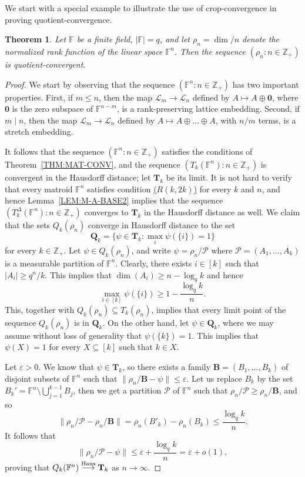 \documentclass[10pt]{article}
\theoremstyle{plain}
\newtheorem{thm}{Theorem}[section]
\theoremstyle{definition}
\newcommand{\bB}{\mathbf{B}}
\newcommand{\bT}{\mathbf{T}}
\newcommand{\bQ}{\mathbf{Q}}
\newcommand{\bbZ}{\mathbb{Z}}
\newcommand{\bbF}{\mathbb{F}}
\newcommand{\LL}{\mathcal{L}}
\newcommand{\cP}{\mathcal{P}}
\newcommand{\eps}{\varepsilon}
\newcommand{\Haus}{{\text{\rm Haus}}}
\newcommand{\hto}{\stackrel{\Haus}{\longrightarrow}}
\begin{document}
We start with a special example to illustrate the use of crop-convergence in
proving quotient-convergence.

\begin{thm}\label{THM:FIN-GEOM}
Let $ \bbF$ be a finite field, $|\bbF|=q$, and let $\rho_n=\dim/n$ denote the
normalized rank function of the linear space $\bbF^n$. Then the sequence
$(\rho_n\colon n\in\bbZ_+)$ is quotient-convergent.
\end{thm}
\begin{proof}
We start by observing that the sequence $(\bbF^n\colon n\in\bbZ_+)$ has two important properties. First, if $m\le n$, then the map $\LL_m\to\LL_n$ defined by $A\mapsto A\oplus \mathbf{0}$, where $\mathbf{0}$ is the zero subspace of $\bbF^{n-m}$, is a rank-preserving lattice embedding. Second, if $m\mid n$, then the map $\LL_m\to\LL_n$ defined by $A\mapsto A\oplus\dots\oplus A$, with $n/m$ terms, is a stretch embedding. 

It follows that the sequence $(\bbF^n\colon n\in\bbZ_+)$ satisfies the conditions of Theorem~\ref{THM:MAT-CONV}, and the sequence $(T_k(\bbF^n)\colon n\in\bbZ_+)$ is
convergent in the Hausdorff distance; let $ \bT_k$ be its limit. It is not hard to verify that every matroid $\bbF^n$ satisfies condition
\hyperlink{rkm}{($R(k,2k)$)} for every $k$ and $n$, and hence Lemma~\ref{LEM:M-A-BASE2} implies
that the sequence $(T^\Delta_k(\bbF^n)\colon n\in\bbZ_+)$ converges to $ \bT_k$ in the
Hausdorff distance as well. We claim that the sets $Q_k(\rho_n)$ converge in Hausdorff distance to the set
\[
 \bQ_k=\{\psi\in \bT_k\colon \max_i\psi(\{i\})=1\}
\]
for every $k\in\bbZ_+$. Let $\psi\in Q_k(\rho_n)$, and write $\psi=\rho_n/\cP$ where $\cP=(A_1,\dots,A_k)$ is a measurable partition of $ \bbF^n$. Clearly,
there exists $i\in[k]$ such that $|A_i|\ge q^n/k$. This implies that
$\dim(A_i)\ge n-\log_q k$ and hence
\begin{equation*}\label{EQ:QQK1}
\max_{i\in[k]} \psi(\{i\}) \ge  1-\frac{\log_q k}{n}.
\end{equation*}
This, together with $Q_k(\rho_n)\subseteq T_k(\rho_n)$, implies that every limit point of the sequence
$Q_k(\rho_n)$ is in $\bQ_k$. On the other hand, let
$\psi\in \bQ_k$, where we may assume without loss of generality that $\psi(\{k\})=1$. This implies that $\psi(X)=1$ for every $X\subseteq [k]$ such that $k\in X$.

Let $\eps>0$. We know that $\psi \in \bT_k$, so there exists a family
$ \bB=(B_1,\dots,B_k)$ of disjoint subsets of $\bbF^n$ such that
$\|\rho_n/ \bB-\psi\|\le \eps$. Let us replace $B_k$ by the set
$B_k'=\bbF^n\setminus\bigcup_{j=1}^{k-1} B_j$, then we get a partition $\cP$ of
$\bbF^n$ such that $\rho_n/\cP\ge\rho_n/ \bB$, and so
\[
\|\rho_n/\cP-\rho_n/ \bB\|=\rho_n(B'_k)-\rho_n(B_k) \le \frac{\log_q k}{n}.
\]
It follows that 
\[
\|\rho_n/\cP-\psi\| \le \eps+\frac{\log_q k}{n} =\eps+o(1),
\]
proving that $Q_k(\bbF^n)\hto \bT_k$ as $n\to\infty$.
\end{proof}
\end{document}
